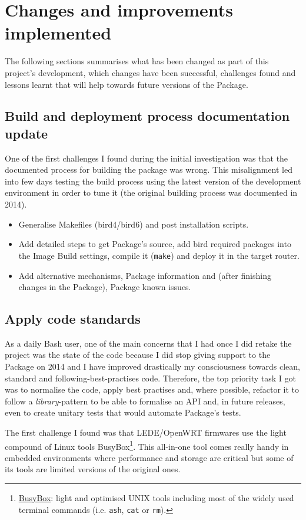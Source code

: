 \section{Changes and improvements implemented}
The following sections summarises what has been changed as part of this project's development, which changes have been successful, challenges found and lessons learnt that will help towards future versions of the Package.

\subsection{Build and deployment process documentation update}
One of the first challenges I found during the initial investigation was that the documented process for building the package was wrong. This misalignment led into few days testing the build process using the latest version of the development environment in order to tune it (the original building process was documented in 2014).

\begin{itemize}
    \item Generalise Makefiles (bird4/bird6) and post installation scripts.
    \item Add detailed steps to get Package's source, add bird required packages into the Image Build settings, compile it (\texttt{make}) and deploy it in the target router.
    \item Add alternative mechanisms, Package information and (after finishing changes in the Package), Package known issues.
\end{itemize}

\subsection{Apply code standards}
As a daily Bash user, one of the main concerns that I had once I did retake the project was the state of the code because I did stop giving support to the Package on 2014 and I have improved drastically my consciousness towards clean, standard and following-best-practises code. Therefore, the top priority task I got was to normalise the code, apply best practises and, where possible, refactor it to follow a \textit{library}-pattern to be able to formalise an API and, in future releases, even to create unitary tests that would automate Package's tests.

The first challenge I found was that LEDE/OpenWRT firmwares use the light compound of Linux tools BusyBox\footnote{\href{https://busybox.net/downloads/BusyBox.html}{BusyBox}: light and optimised UNIX tools including most of the widely used terminal commands (i.e. \texttt{ash}, \texttt{cat} or \texttt{rm}).}. This all-in-one tool comes really handy in embedded environments where performance and storage are critical but some of its tools are limited versions of the original ones.

